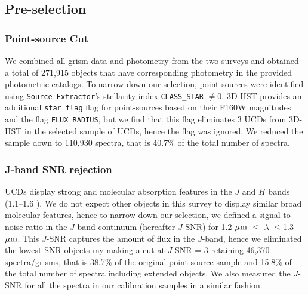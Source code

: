 \documentclass[manuscript]{aastex63}
\begin{document}
\subsection{Pre-selection}
\subsubsection{Point-source Cut}
We combined all grism data and photometry from the two surveys and obtained a total of 271,915 objects that have corresponding photometry in the provided photometric catalogs. To narrow down our selection, point sources were identified using \texttt{Source Extractor}'s stellarity index \texttt{CLASS\_STAR} $\neq$0. 3D-HST provides an additional \texttt{star\_flag} flag for point-sources based on their F160W magnitudes and the flag \texttt{FLUX\_RADIUS}, but we find that this flag eliminates 3 UCDs from 3D-HST in the selected sample of UCDs, hence the flag was ignored. We reduced the sample down to 110,930 spectra, that is 40.7\% of the total number of spectra.


\subsubsection{J-band SNR rejection }
UCDs display strong \wat and \meth molecular absorption features in the $J$ and $H$ bands (1.1--1.6 \micron). We do not expect other objects in this survey to display similar broad molecular features, hence to narrow down our selection, we defined a signal-to-noise ratio in the $J$-band continuum (hereafter $J$-SNR) for 1.2 $\mbox{$\mu$m}$ $\leq$ $\lambda$ $\leq$1.3 $\mbox{$\mu$m}$. This $J$-SNR captures the amount of flux in the $J$-band, hence we eliminated the lowest SNR objects my making a cut at $J$-SNR = 3 retaining 46,370 spectra/grisms, that is 38.7\% of the original point-source sample and 15.8\% of the total number of spectra including extended objects. We also measured the $J$-SNR for all the spectra in our calibration samples in a similar fashion.
\end{document}
